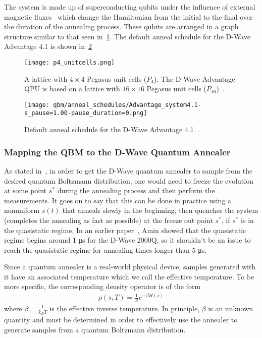 The system is made up of superconducting qubits under the influence of external magnetic fluxes~\cite{qc_lecture_notes} which change the Hamiltonian from the initial to the final over the duration of the annealing process.
These qubits are arranged in a graph structure similar to that seen in~\cref{fig:p4_unitcells}.
The default anneal schedule for the D-Wave Advantage 4.1 is shown in~\cref{fig:anneal_schedule_default}
\begin{figure}[!htb]
    \begin{center}
        \texttt{[image: p4\_unitcells.png]}
    \end{center}
    \caption{A lattice with \( 4 \times 4 \) Pegasus unit cells (\( P_4 \)). The D-Wave Advantage QPU is based on a lattice with \( 16 \times 16 \) Pegasus unit cells (\( P_{16} \))~\cite{dwave_topologies}.}
    \label{fig:p4_unitcells}
\end{figure}
\begin{figure}[!htb]
    \begin{center}
        \texttt{[image: qbm/anneal\_schedules/Advantage\_system4.1-s\_pause=1.00-pause\_duration=0.png]}
    \end{center}
    \caption{Default anneal schedule for the D-Wave Advantage 4.1~\cite{dwave_anneal_schedules}.}
    \label{fig:anneal_schedule_default}
\end{figure}

\subsubsection{Mapping the QBM to the D-Wave Quantum Annealer}
As stated in~\cite{amin_2018}, in order to get the D-Wave quantum annealer to sample from the desired quantum Boltzmann distribution, one would need to freeze the evolution at some point \( s^* \) during the annealing process and then perform the measurements.
It goes on to say that this can be done in practice using a nonuniform \( s(t) \) that anneals slowly in the beginning, then quenches the system (completes the annealing as fast as possible) at the freeze out point \( s^* \), if \( s^* \) is in the quasistatic regime.
In an earlier paper~\cite{amin_2015}, Amin showed that the quasistatic regime begins around 1 \si{\micro\second} for the D-Wave 2000Q, so it shouldn't be an issue to reach the quasistatic regime for annealing times longer than 5 \si{\micro\second}.

Since a quantum annealer is a real-world physical device, samples generated with it have an associated temperature which we call the effective temperature.
To be more specific, the corresponding density operator is of the form
\begin{align}
    \rho(s, T) = \frac{1}{Z} e^{-\beta H(s)}
\end{align}
where \( \beta = \frac{1}{k_B T} \) is the effective inverse temperature.
In principle, \( \beta \) is an unknown quantity and must be determined in order to effectively use the annealer to generate samples from a quantum Boltzmann distribution.


